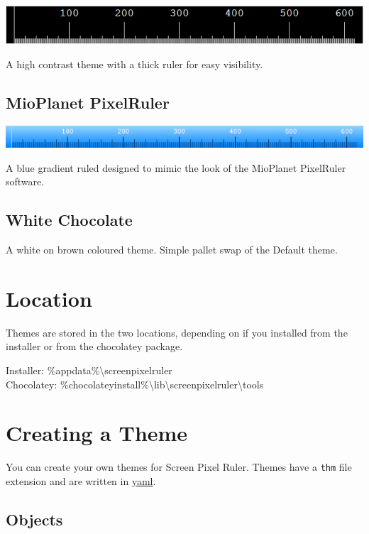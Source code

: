 \documentclass[
]{book}
\begin{document}
\includegraphics{images/theme-panda.png}

A high contrast theme with a thick ruler for easy visibility.

\hypertarget{mioplanet-pixelruler}{%
\subsection{MioPlanet PixelRuler}\label{mioplanet-pixelruler}}

\includegraphics{images/theme-mioplanet.png}

A blue gradient ruled designed to mimic the look of the MioPlanet PixelRuler software.

\hypertarget{white-chocolate}{%
\subsection{White Chocolate}\label{white-chocolate}}

A white on brown coloured theme.
Simple pallet swap of the Default theme.

\hypertarget{location-1}{%
\section{Location}\label{location-1}}

Themes are stored in the two locations, depending on if you installed from the installer or from the chocolatey package.

Installer: \%appdata\%\textbackslash screenpixelruler\\
Chocolatey: \%chocolateyinstall\%\textbackslash lib\textbackslash screenpixelruler\textbackslash tools

\hypertarget{creating-a-theme}{%
\section{Creating a Theme}\label{creating-a-theme}}

You can create your own themes for Screen Pixel Ruler.
Themes have a \texttt{thm} file extension and are written in \href{https://yaml.org}{yaml}.

\hypertarget{objects}{%
\subsection{Objects}\label{objects}}
\end{document}
